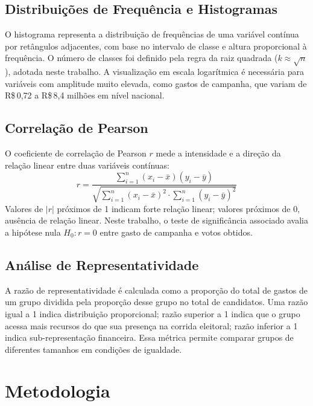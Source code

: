 \documentclass[conference]{IEEEtran}
\begin{document}
\subsection{Distribuições de Frequência e Histogramas}

O histograma representa a distribuição de frequências de uma variável contínua
por retângulos adjacentes, com base no intervalo de classe e altura proporcional
à frequência. O número de classes foi definido pela regra da raiz quadrada
($k \approx \sqrt{n}$), adotada neste trabalho. A visualização em escala
logarítmica é necessária para variáveis com amplitude muito elevada, como gastos
de campanha, que variam de R\$\,0{,}72 a R\$\,8{,}4 milhões em nível nacional.

\subsection{Correlação de Pearson}

O coeficiente de correlação de Pearson $r$ mede a intensidade e a direção da
relação linear entre duas variáveis contínuas:
\begin{equation}
  r = \frac{\sum_{i=1}^{n}(x_i - \bar{x})(y_i - \bar{y})}
           {\sqrt{\sum_{i=1}^{n}(x_i - \bar{x})^2 \cdot
                  \sum_{i=1}^{n}(y_i - \bar{y})^2}}
\end{equation}
Valores de $|r|$ próximos de 1 indicam forte relação linear; valores próximos
de 0, ausência de relação linear. Neste trabalho, o teste de significância
associado avalia a hipótese nula $H_0: r = 0$ entre gasto de campanha e votos
obtidos.

\subsection{Análise de Representatividade}

A razão de representatividade é calculada como a proporção do total de gastos
de um grupo dividida pela proporção desse grupo no total de candidatos. Uma
razão igual a 1 indica distribuição proporcional; razão superior a 1 indica que
o grupo acessa mais recursos do que sua presença na corrida eleitoral; razão
inferior a 1 indica sub-representação financeira. Essa métrica permite comparar
grupos de diferentes tamanhos em condições de igualdade.

\section{Metodologia}
\end{document}
